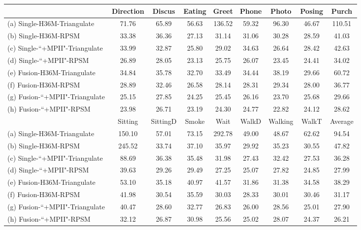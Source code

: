 \documentclass[10pt,twocolumn,letterpaper]{article}
\begin{document}
\begin{table*}[]
\center
\caption{D pose estimation errors MPJPE () of different methods on the H36M dataset. The naming convention of the methods follows the rule of ``A-B-C'' where ``A'' indicates whether we use fusion in D pose estimation. ``Single'' means the cross view fusion is not used. ``B'' denotes the training datasets. ``H36M'' means we only use the H36M dataset and ``+MPII'' means we combine H36M with MPII for training. ``C'' represents the method for estimating D poses.}
\label{table:baselines3d}
\begin{tabular}{l c c c c c c c c}
\toprule
& Direction & Discus & Eating & Greet & Phone & Photo & Posing & Purch \\
\toprule
(a) Single-H36M-Triangulate & 71.76 & 65.89 & 56.63 & 136.52 & 59.32 & 96.30 & 46.67 & 110.51\\
(b) Single-H36M-RPSM & 33.38 & 36.36 & 27.13 & 31.14 & 31.06 & 30.28 & 28.59 & 41.03\\
(c) Single-``+MPII"-Triangulate & 33.99 & 32.87 & 25.80 & 29.02 & 34.63 & 26.64 & 28.42 & 42.63\\
(d) Single-``+MPII"-RPSM & 26.89 & 28.05 & 23.13 & 25.75 & 26.07 & 23.45 & 24.41 & 34.02\\
(e) Fusion-H36M-Triangulate & 34.84 & 35.78 & 32.70 & 33.49 & 34.44 & 38.19 & 29.66 & 60.72\\ 
(f) Fusion-H36M-RPSM & 28.89 & 32.46 & 26.58 & 28.14 & 28.31 & 29.34 & 28.00 & 36.77\\ 
(g) Fusion-``+MPII"-Triangulate & 25.15 & 27.85 & 24.25 & 25.45 & 26.16 & 23.70 & 25.68 & 29.66\\
(h) Fusion-``+MPII"-RPSM & 23.98 & 26.71 & 23.19 & 24.30 & 24.77 & 22.82 & 24.12 & 28.62\\

\toprule
& Sitting & SittingD & Smoke & Wait & WalkD & Walking & WalkT & Average \\
\toprule
(a) Single-H36M-Triangulate  & 150.10 & 57.01 & 73.15 & 292.78 & 49.00 & 48.67 & 62.62 & 94.54\\
(b) Single-H36M-RPSM  & 245.52 & 33.74 & 37.10 & 35.97 & 29.92 & 35.23 & 30.55 & 47.82\\
(c) Single-``+MPII"-Triangulate & 88.69 & 36.38 & 35.48 & 31.98 & 27.43 & 32.42 & 27.53 & 36.28\\ 
(d) Single-``+MPII"-RPSM & 39.63 & 29.26 & 29.49 & 27.25 & 25.07 & 27.82 & 24.85 & 27.99\\
(e) Fusion-H36M-Triangulate & 53.10 & 35.18 & 40.97 & 41.57 & 31.86 & 31.38 & 34.58 & 38.29\\ 
(f) Fusion-H36M-RPSM & 41.98 & 30.54 & 35.59 & 30.03 & 28.33 & 30.01 & 30.46 & 31.17\\ 
(g) Fusion-``+MPII"-Triangulate & 40.47 & 28.60 & 32.77 & 26.83 & 26.00 & 28.56 & 25.01& 27.90\\
(h) Fusion-``+MPII"-RPSM  & 32.12 & 26.87 & 30.98 & 25.56 & 25.02 & 28.07 & 24.37 & 26.21 \\
\toprule
\end{tabular}

\end{table*}
\end{document}
